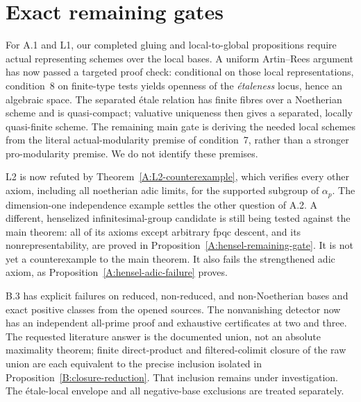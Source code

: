 \section{Exact remaining gates}
For A.1 and L1, our completed gluing and local-to-global propositions require
actual representing schemes over the local bases. A uniform Artin--Rees
argument has now passed a targeted proof check: conditional on those local
representations, condition~8 on finite-type tests yields openness of the
\emph{\'etaleness} locus, hence an algebraic space. The separated \'etale
relation has finite fibres over a Noetherian scheme and is quasi-compact;
valuative uniqueness then gives a separated, locally quasi-finite scheme.
The remaining main gate is deriving the needed local schemes from the literal
actual-modularity premise of condition~7, rather than a stronger
pro-modularity premise. We do not identify these premises.

L2 is now refuted by Theorem~\ref{A:L2-counterexample}, which verifies
every other axiom, including all noetherian adic limits, for the supported
subgroup of $\alpha_p$. The dimension-one independence example settles
the other question of A.2. A different, henselized infinitesimal-group
candidate is still being tested against the main theorem: all of its
axioms except arbitrary fpqc descent, and its nonrepresentability, are
proved in Proposition~\ref{A:hensel-remaining-gate}. It is not yet a
counterexample to the main theorem. It also fails the strengthened
adic axiom, as Proposition~\ref{A:hensel-adic-failure} proves.

B.3 has explicit failures on reduced, non-reduced, and non-Noetherian bases
and exact positive classes from the opened sources. The nonvanishing detector now has an independent all-prime proof and
exhaustive certificates at two and three. The requested literature
answer is the documented union, not an absolute maximality theorem;
finite direct-product and filtered-colimit closure of the raw union
are each equivalent to the precise inclusion isolated in
Proposition~\ref{B:closure-reduction}. That inclusion remains under
investigation. The \'etale-local envelope and all negative-base
exclusions are treated separately.

